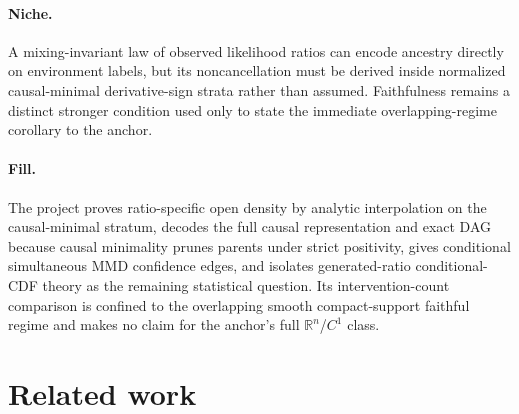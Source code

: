 \documentclass{article}
\begin{document}
\paragraph{Niche.} A mixing-invariant law of observed likelihood ratios can encode ancestry directly on environment labels, but its noncancellation must be derived inside normalized causal-minimal derivative-sign strata rather than assumed. Faithfulness remains a distinct stronger condition used only to state the immediate overlapping-regime corollary to the anchor.

\paragraph{Fill.} The project proves ratio-specific open density by analytic interpolation on the causal-minimal stratum, decodes the full causal representation and exact DAG because causal minimality prunes parents under strict positivity, gives conditional simultaneous MMD confidence edges, and isolates generated-ratio conditional-CDF theory as the remaining statistical question. Its intervention-count comparison is confined to the overlapping smooth compact-support faithful regime and makes no claim for the anchor's full \(\mathbb R^n\)/\(C^1\) class.

\section{Related work}
\end{document}
